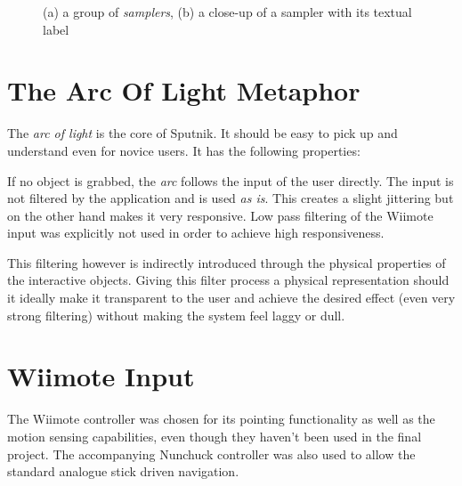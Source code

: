 \documentclass[10pt,a4paper]{scrartcl}
\begin{document}
\begin{figure}[hbtp]
\begin{center}
\caption{(a) a group of \emph{samplers}, (b) a close-up of a sampler with its textual label}
\end{center}
\end{figure}


\section{The Arc Of Light Metaphor}
The \emph{arc of light} is the core of Sputnik. It should be easy to pick up and understand even for novice users. It has the following properties:

If no object is grabbed, the \emph{arc} follows the input of the user directly. The input is not filtered by the application and is used \emph{as is}. This creates a slight jittering but on the other hand makes it very responsive. Low pass filtering of the Wiimote input was explicitly not used in order to achieve high responsiveness.

This filtering however is indirectly introduced through the physical properties of the interactive objects. Giving this filter process a physical representation should it ideally make it transparent to the user and achieve the desired effect (even very strong filtering) without making the system feel laggy or dull.




\section{Wiimote Input}
The Wiimote controller was chosen for its pointing functionality as well as the motion sensing capabilities, even though they haven't been used in the final project. The accompanying Nunchuck controller was also used to allow the standard analogue stick driven navigation.
\end{document}
